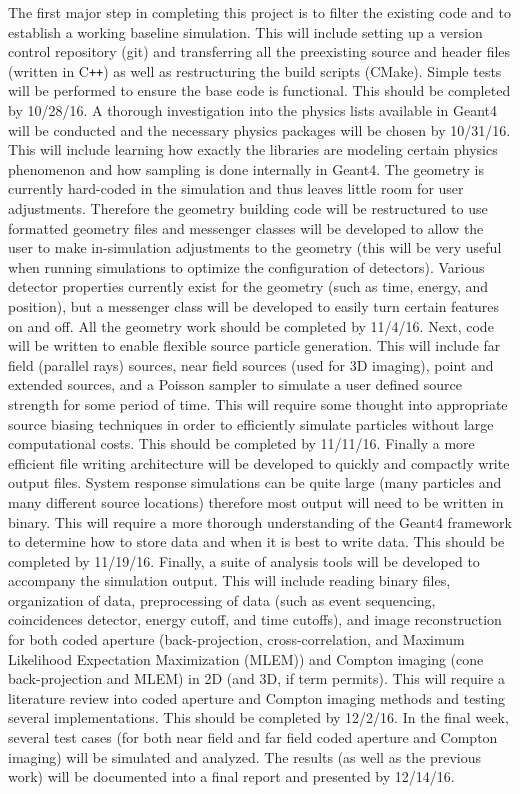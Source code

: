 \documentclass[10pt]{article}
\begin{document}
The first major step in completing this project is to filter the existing code and to establish a working baseline simulation. This will include setting up a version control repository (git) and transferring all the preexisting source and header files (written in C\texttt{++}) as well as restructuring the build scripts (CMake). Simple tests will be performed to ensure the base code is functional. This should be completed by 10/28/16. A thorough investigation into the physics lists available in Geant4 will be conducted and the necessary physics packages will be chosen by 10/31/16. This will include learning how exactly the libraries are modeling certain physics phenomenon and how sampling is done internally in Geant4. The geometry is currently hard-coded in the simulation and thus leaves little room for user adjustments. Therefore the geometry building code will be restructured to use formatted geometry files and messenger classes will be developed to allow the user to make in-simulation adjustments to the geometry (this will be very useful when running simulations to optimize the configuration of detectors). Various detector properties currently exist for the geometry (such as time, energy, and position), but a messenger class will be developed to easily turn certain features on and off.  All the geometry work should be completed by 11/4/16. Next, code will be written to enable flexible source particle generation. This will include far field (parallel rays) sources, near field sources (used for 3D imaging), point and extended sources, and a Poisson sampler to simulate a user defined source strength for some period of time. This will require some thought into appropriate source biasing techniques in order to efficiently simulate particles without large computational costs. This should be completed by 11/11/16. Finally a more efficient file writing architecture will be developed to quickly and compactly write output files. System response simulations can be quite large (many particles and many different source locations) therefore most output will need to be written in binary. This will require a more thorough understanding of the Geant4 framework to determine how to store data and when it is best to write data. This should be completed by 11/19/16. Finally, a suite of analysis tools will be developed to accompany the simulation output. This will include reading binary files, organization of data, preprocessing of data (such as event sequencing, coincidences detector, energy cutoff, and time cutoffs), and image reconstruction for both coded aperture (back-projection, cross-correlation, and Maximum Likelihood Expectation Maximization (MLEM)) and Compton imaging (cone back-projection and MLEM) in 2D (and 3D, if term permits). This will require a literature review into coded aperture and Compton imaging methods and testing several implementations. This should be completed by 12/2/16. In the final week, several test cases (for both near field and far field coded aperture and Compton imaging) will be simulated and analyzed. The results (as well as the previous work) will be documented into a final report and presented by 12/14/16.
\end{document}
